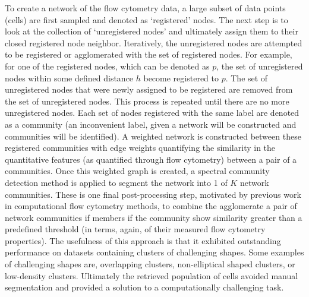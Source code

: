 \indent To create a network of the flow cytometry data, a large subset of data points (cells) are first sampled and denoted as `registered' nodes. The next step is to look at the collection of `unregistered nodes' and ultimately assign them to their closed registered node neighbor. Iteratively, the unregistered nodes are attempted to be registered or agglomerated with the set of registered nodes. For example, for one of the registered nodes, which can be denoted as $p$, the set of unregistered nodes within some defined distance $h$ become registered to $p$.  The set of unregistered nodes that were newly assigned to be registered are removed from the set of unregistered nodes. This process is repeated until there are no more unregistered nodes. Each set of nodes registered with the same label are denoted as a community (an inconvenient label, given a network will be constructed and communities will be identified). A weighted network is constructed between these registered communities with edge weights quantifying the similarity in the quantitative features (as quantified through flow cytometry) between a pair of a communities. Once this weighted graph is created, a spectral community detection method \cite{spectral1} is applied to segment the network into 1 of $K$ network communities. These is one final post-processing step, motivated by previous work in computational flow cytometry methods,  to combine the agglomerate a pair of network communities if members if the community show similarity greater than a predefined threshold (in terms, again, of their measured flow cytometry properties). The usefulness of this approach is that it exhibited outstanding performance on datasets containing clusters of challenging shapes. Some examples of challenging shapes are, overlapping clusters, non-elliptical shaped clusters, or low-density clusters. Ultimately the retrieved population of cells avoided manual segmentation and provided a solution to a computationally challenging task.

